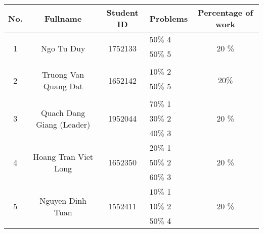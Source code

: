 \begin{center}
\begin{tabular}{|c|c|c|l|c|}
\hline
\textbf{No.} & \textbf{Fullname} & \textbf{Student ID} & \textbf{Problems} & \textbf{Percentage of work}\\
\hline 
\multirow{3}{*}{1} & \multirow{3}{*}{Ngo Tu Duy} & \multirow{3}{*}{1752133} & $50\%$ 4  &
\multirow{3}{*}{$20$ \%}\\
 & &  & $50\%$ 5 &\\
 & &  &  &\\
\hline 
\multirow{3}{*}{2} & \multirow{3}{*}{Truong Van Quang Dat} & \multirow{3}{*}{1652142} & $10\%$ 2 &
\multirow{3}{*}{$20\%$ }\\
 & &  & $50\%$ 5 &\\
 & &  &   &\\
\hline
\multirow{3}{*}{3} & \multirow{3}{*}{Quach Dang Giang (Leader)} & \multirow{3}{*}{1952044} & $70\%$ 1 &
\multirow{3}{*}{$20$ \%}\\
 & &  & $30\%$ 2 &\\
 & &  & $40\%$ 3 &\\
\hline
\multirow{3}{*}{4} & \multirow{3}{*}{Hoang Tran Viet Long} & \multirow{3}{*}{1652350} & $20\%$ 1 &
\multirow{3}{*}{$20$ \%}\\
 & &  & $50\%$ 2 &\\
 & &  & $60\%$ 3 &\\
\hline
\multirow{3}{*}{5} & \multirow{3}{*}{Nguyen Dinh Tuan} & \multirow{3}{*}{1552411} & $10\%$ 1 &
\multirow{3}{*}{$20$ \%}\\
 & &  & $10\%$ 2 &\\
 & &  & $50\%$ 4 &\\
\hline
\end{tabular}
\end{center}